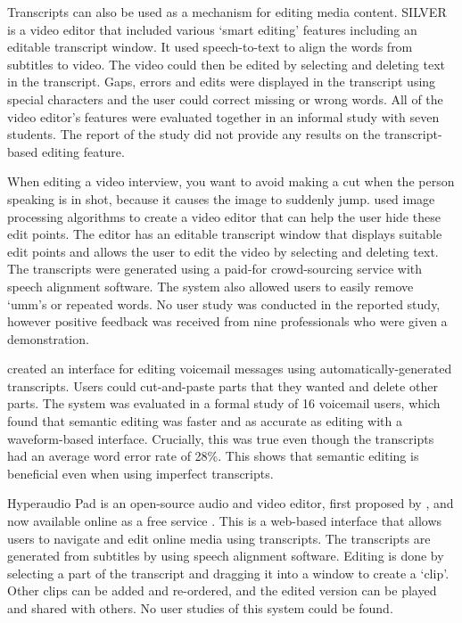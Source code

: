 Transcripts can also be used as a mechanism for editing media content.
\mbox{SILVER} \citep{Casares2002, Long2003} is a video editor that included
various `smart editing' features including an editable transcript window. It
used speech-to-text to align the words from subtitles to video. The video could
then be edited by selecting and deleting text in the transcript. Gaps, errors
and edits were displayed in the transcript using special characters and the
user could correct missing or wrong words. All of the video editor's features
were evaluated together in an informal study with seven students. The report of
the study did not provide any results on the transcript-based editing
feature.

When editing a video interview, you want to avoid making a cut when the person
speaking is in shot, because it causes the image to suddenly jump.
\citet{Berthouzoz2012} used image processing algorithms to create a video
editor that can help the user hide these edit points. The editor has an
editable transcript window that displays suitable edit points and allows the
user to edit the video by selecting and deleting text. The transcripts were
generated using a paid-for crowd-sourcing service with speech alignment
software. The system also allowed users to easily remove `umm's or repeated
words. No user study was conducted in the reported study, however positive
feedback was received from nine professionals who were given a demonstration.

\citet{Whittaker2004} created an interface for editing
voicemail messages using automatically-generated transcripts. Users could
cut-and-paste parts that they wanted and delete other parts.
The system was evaluated in a formal study of 16 voicemail users, which found
that semantic editing was faster and as accurate as editing with a
waveform-based interface. Crucially, this was true even though the transcripts
had an average word error rate of 28\%. This shows that semantic editing is
beneficial even when using imperfect transcripts.

Hyperaudio Pad is an open-source audio and video editor, first proposed by
\citet{Boas2011}, and now available online as a free service
\citep{Hyperaudio2016}. This is a web-based interface that allows users to
navigate and edit online media using transcripts. The transcripts are generated
from subtitles by using speech alignment software. Editing is done by selecting
a part of the transcript and dragging it into a window to create a `clip'.
Other clips can be added and re-ordered, and the edited version can be played
and shared with others. No user studies of this system could be found.

